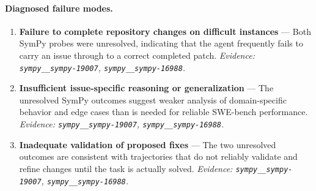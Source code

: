 \paragraph{Diagnosed failure modes.}\begin{enumerate}\itemsep1pt
\item \textbf{Failure to complete repository changes on difficult instances} --- Both SymPy probes were unresolved, indicating that the agent frequently fails to carry an issue through to a correct completed patch. \emph{Evidence: \texttt{sympy\_\_sympy-19007}, \texttt{sympy\_\_sympy-16988}.}
\item \textbf{Insufficient issue-specific reasoning or generalization} --- The unresolved SymPy outcomes suggest weaker analysis of domain-specific behavior and edge cases than is needed for reliable SWE-bench performance. \emph{Evidence: \texttt{sympy\_\_sympy-19007}, \texttt{sympy\_\_sympy-16988}.}
\item \textbf{Inadequate validation of proposed fixes} --- The two unresolved outcomes are consistent with trajectories that do not reliably validate and refine changes until the task is actually solved. \emph{Evidence: \texttt{sympy\_\_sympy-19007}, \texttt{sympy\_\_sympy-16988}.}
\end{enumerate}

